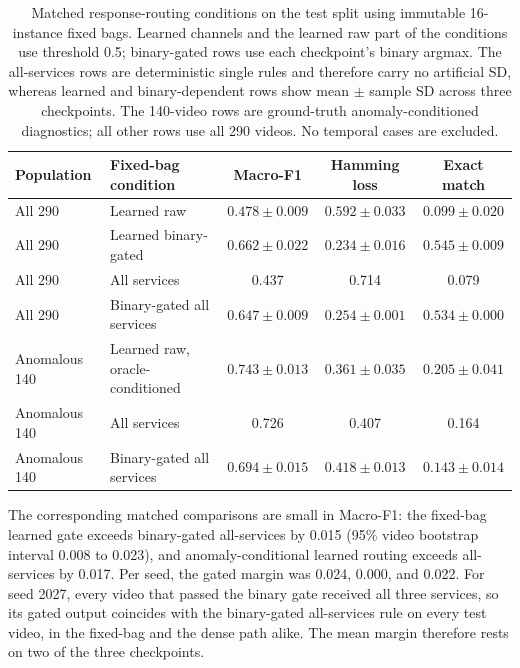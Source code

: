 \begin{table}[tbp]
    \centering
    \footnotesize
    \caption[Matched fixed-bag routing conditions and baselines.]{Matched response-routing conditions on the test split using immutable 16-instance fixed bags. Learned channels and the learned raw part of the conditions use threshold 0.5; binary-gated rows use each checkpoint's binary argmax. The all-services rows are deterministic single rules and therefore carry no artificial SD, whereas learned and binary-dependent rows show mean $\pm$ sample SD across three checkpoints. The 140-video rows are ground-truth anomaly-conditioned diagnostics; all other rows use all 290 videos. No temporal cases are excluded.}
    \label{tab:results-fixed-routing}
    \begin{tabular}{@{}llccc@{}}
        \toprule
        \textbf{Population} & \textbf{Fixed-bag condition} & \textbf{Macro-F1} & \textbf{Hamming loss} & \textbf{Exact match} \\
        \midrule
        All 290 & Learned raw & $0.478 \pm 0.009$ & $0.592 \pm 0.033$ & $0.099 \pm 0.020$ \\
        All 290 & Learned binary-gated & $0.662 \pm 0.022$ & $0.234 \pm 0.016$ & $0.545 \pm 0.009$ \\
        All 290 & All services & 0.437 & 0.714 & 0.079 \\
        All 290 & Binary-gated all services & $0.647 \pm 0.009$ & $0.254 \pm 0.001$ & $0.534 \pm 0.000$ \\
        \addlinespace
        Anomalous 140 & Learned raw, oracle-conditioned & $0.743 \pm 0.013$ & $0.361 \pm 0.035$ & $0.205 \pm 0.041$ \\
        Anomalous 140 & All services & 0.726 & 0.407 & 0.164 \\
        Anomalous 140 & Binary-gated all services & $0.694 \pm 0.015$ & $0.418 \pm 0.013$ & $0.143 \pm 0.014$ \\
        \bottomrule
    \end{tabular}
\end{table}

The corresponding matched comparisons are small in Macro-F1: the fixed-bag learned gate exceeds binary-gated all-services by 0.015 (95\% video bootstrap interval 0.008 to 0.023), and anomaly-conditional learned routing exceeds all-services by 0.017. Per seed, the gated margin was 0.024, 0.000, and 0.022. For seed 2027, every video that passed the binary gate received all three services, so its gated output coincides with the binary-gated all-services rule on every test video, in the fixed-bag and the dense path alike. The mean margin therefore rests on two of the three checkpoints.

